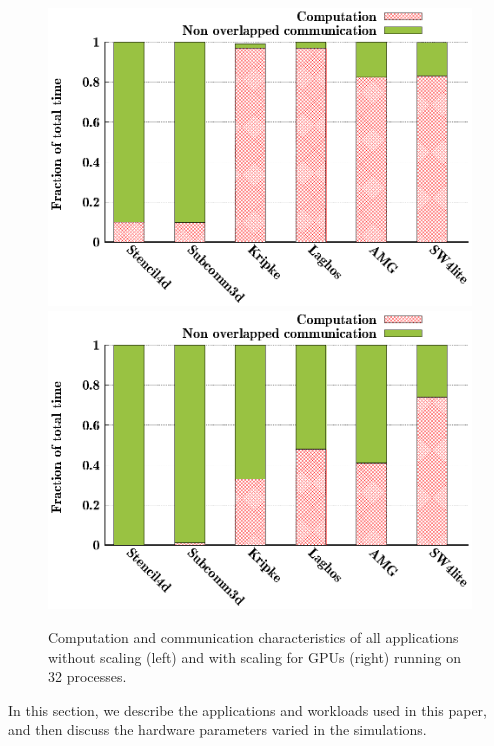 \begin{figure}[t]
  \centering
  \includegraphics[width=\columnwidth]{figure/val/mpi-scaled.eps}
  \includegraphics[width=\columnwidth]{figure/val/mpi.eps}
  \caption{Computation and communication characteristics of all applications without scaling (left) and with scaling for GPUs (right)
running on 32 processes.} 
  \label{fig:trace_profile}
\end{figure}

In this section, we describe the applications and workloads used in this paper,
and then discuss the hardware parameters varied in the simulations.


